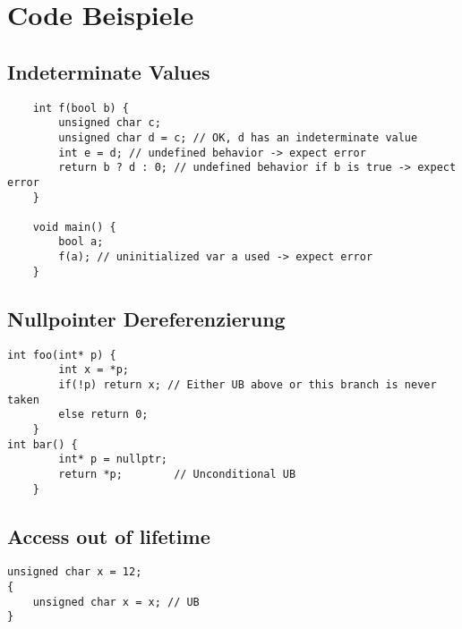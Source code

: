 \lstset{language=cpp}

\section{Code Beispiele}
\label{sec:codebsp}

\subsection{Indeterminate Values}
\label{subsec:indeterminate}
\begin{lstlisting}
    int f(bool b) {
        unsigned char c;
        unsigned char d = c; // OK, d has an indeterminate value 
        int e = d; // undefined behavior -> expect error
        return b ? d : 0; // undefined behavior if b is true -> expect error
    }
    
    void main() {
        bool a;
        f(a); // uninitialized var a used -> expect error
    }
\end{lstlisting}
\cite[S.63 f.]{book:cpp-standard}

\subsection{Nullpointer Dereferenzierung}
\label{subsec:nullpointer}

\begin{lstlisting}
int foo(int* p) {
        int x = *p;
        if(!p) return x; // Either UB above or this branch is never taken
        else return 0;
    }
int bar() {
        int* p = nullptr;
        return *p;        // Unconditional UB
    }
\end{lstlisting}
\cite{misc:cpp-undefined}

\subsection{Access out of lifetime}
\label{subsec:outside-lifetime}

\begin{lstlisting}
unsigned char x = 12;
{ 
    unsigned char x = x; // UB
}
\end{lstlisting}
\cite[S.35]{book:cpp-standard}
